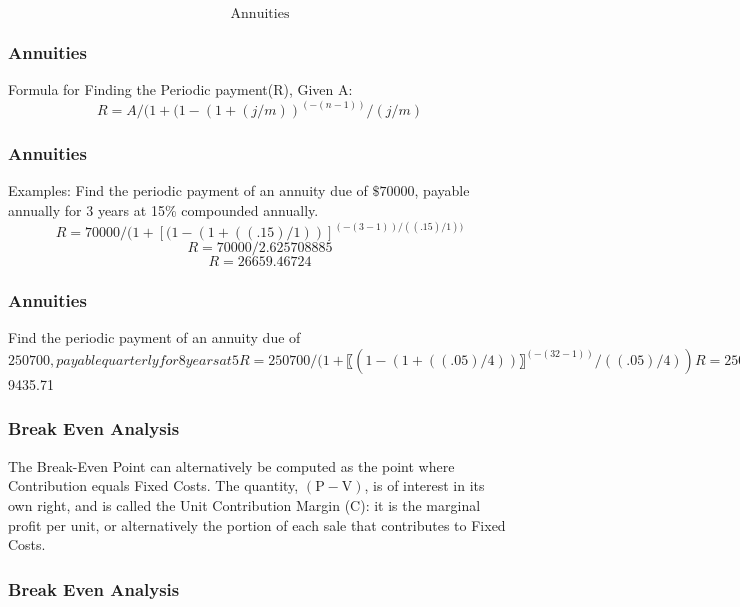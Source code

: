 \documentclass{beamer}
\begin{document}
\begin{frame}
\Large
\[\mbox{Annuities}\]
\end{frame}

\begin{frame}
\frametitle{Annuities}
Formula for Finding the Periodic payment(R), Given A:
\[R = A/(1+(1-(1+(j/m) )^(-(n-1))/(j/m)\]
\end{frame}

\begin{frame}
\frametitle{Annuities}
Examples:
Find the periodic payment of an annuity due of $\$70000$, payable annually for 3 years at 15\% compounded annually.
\[R = 70000/(1+[(1-(1+((.15)/1) )]^{(-(3-1))/((.15)/1))}\]
\[R = 70000/2.625708885\]
\[R = 26659.46724\]
\end{frame}

\begin{frame}
\frametitle{Annuities}
Find the periodic payment of an annuity due of $250700, payable quarterly for 8 years at 5%
R= 250700/(1+〖(1-(1+((.05)/4) )〗^(-(32-1))/((.05)/4))
R = 250700/26.5692901
R = $9435.71
\end{frame}

\begin{frame}
\frametitle{Break Even Analysis}

The Break-Even Point can alternatively be computed as the point where Contribution equals Fixed Costs.
The quantity, $\left(\text{P} - \text{V}\right)$, is of interest in its own right, and is called the Unit Contribution Margin (C): it is the marginal profit per unit, or alternatively the portion of each sale that contributes to Fixed Costs. 
\end{frame}

\begin{frame}
\frametitle{Break Even Analysis}

\end{frame}
\end{document}
